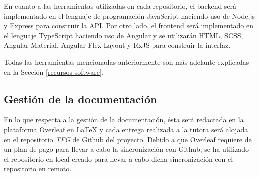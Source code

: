 En cuanto a las herramientas utilizadas en cada repositorio, el backend será implementado en el lenguaje de programación JavaScript haciendo uso de Node.js y Express para construir la API. Por otro lado, el frontend será implementado en el lenguaje TypeScript haciendo uso de Angular y se utilizarán HTML, SCSS, Angular Material, Angular Flex-Layout y RxJS para construir la interfaz. \bigskip

Todas las herramientas mencionadas anteriormente son más adelante explicadas en la Sección \ref{recursos-software}.

\subsection{Gestión de la documentación}
En lo que respecta a la gestión de la documentación, ésta será redactada en la plataforma Overleaf en LaTeX y cada entrega realizada a la tutora será alojada en el repositorio \textit{TFG} de Github del proyecto. Debido a que Overleaf requiere de un plan de pago para llevar a cabo la sincronización con Github, se ha utilizado el repositorio en local creado para llevar a cabo dicha sincronización con el repositorio en remoto.

